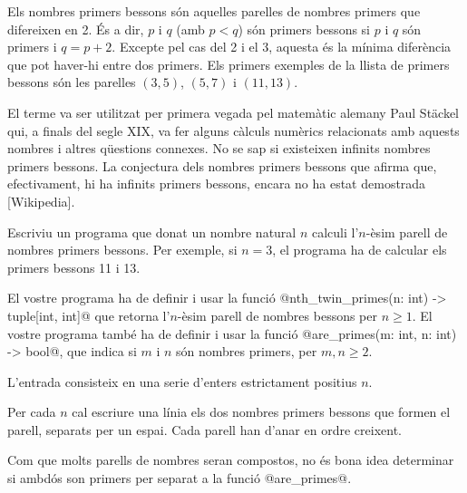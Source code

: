 

\Statement

Els nombres primers bessons són aquelles parelles de nombres primers que difereixen en 2. És a dir, $p$ i $q$ (amb $p < q$) són primers bessons si $p$ i $q$ són primers i $q = p + 2$. Excepte pel cas del 2 i el 3, aquesta és la mínima diferència que pot haver-hi entre dos primers. Els primers exemples de la llista de primers bessons són les parelles $(3, 5)$, $(5,7)$ i $(11,13)$. 


\medskip

El terme va ser utilitzat per primera vegada pel matemàtic alemany Paul Stäckel qui, a finals del segle XIX, va fer alguns càlculs numèrics relacionats amb aquests nombres i altres qüestions connexes. No se sap si existeixen infinits nombres primers bessons. La conjectura dels nombres primers bessons que afirma que, efectivament, hi ha infinits primers bessons, encara no ha estat demostrada [Wikipedia].

\medskip

Escriviu un programa que donat un nombre natural $n$ calculi l'$n$-èsim parell de nombres primers bessons. Per exemple, si $n = 3$, el programa ha de calcular els primers bessons 11 i 13.

\medskip

El vostre programa ha de definir i usar la funció 
@nth_twin_primes(n: int) -> tuple[int, int]@
que retorna l'$n$-èsim parell de nombres bessons per $n \ge 1$. 
El vostre programa també ha de definir i usar la funció 
@are_primes(m: int, n: int) -> bool@,
que indica si $m$ i $n$ són nombres primers, per $m,n\ge 2$.


\Input

L'entrada consisteix en una serie d'enters estrictament positius $n$. 

\Output

Per cada $n$ cal escriure una línia els dos nombres primers bessons que formen el parell, separats per un espai. Cada parell han d'anar en ordre creixent.

\Sample


\Observation

Com que molts parells de nombres seran compostos, no és bona idea determinar si ambdós son primers per separat a la funció @are_primes@.
